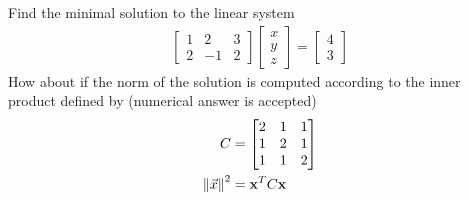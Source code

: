 \begin{Exercise}
Find the minimal solution to the linear system
\begin{align*}
\begin{bmatrix}
1 & 2 & 3 \\
2 & -1 & 2
\end{bmatrix}
\begin{bmatrix}
x \\
y \\
z
\end{bmatrix}
=
\begin{bmatrix}
4 \\
3
\end{bmatrix}
\end{align*}
How about if the norm of the solution is computed according to the inner product defined by (numerical answer is accepted)
\begin{align*}
C &= 
\begin{bmatrix}
2 & 1 & 1 \\
1 & 2 & 1 \\
1 & 1 & 2
\end{bmatrix} \\
\norm{\vec{x}}^2 &= \textbf{x}^TC\textbf{x}
\end{align*}
\end{Exercise}
